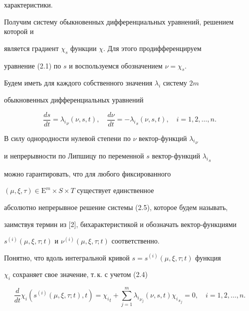 характеристики.





Получим систему обыкновенных дифференциальных уравнений, решением которой и 


является градиент $\chi_s$ функции $\chi$. Для этого продифференцируем 


уравнение (2.1) по $s$ и воспользуемся обозначением $\nu=\chi_s$.


Будем иметь для каждого собственного значения $\lambda_i$ систему $2m$


обыкновенных дифференциальных уравнений


\begin{equation}


\frac{ds}{dt}={\lambda_i}_\nu (\nu,s,t), \quad


\frac{d\nu}{dt}=- {\lambda_i}_s (\nu,s,t),\quad i=1,2,\dotsc,n.


\end{equation}





В силу однородности нулевой степени по $\nu$ вектор-функций ${\lambda_i}_\nu$ 


и непрерывности по Липшицу по переменной $s$ вектор-функций ${\lambda_i}_s$


можно гарантировать, что для любого фиксированного 


$(\mu,\xi,\tau) \in {\mathrm E}^m \times S \times T$ существует единственное 


абсолютно непрерывное решение системы (2.5), которое будем называть, 


заимствуя термин из [2], бихарактеристикой и обозначать вектор-функциями 


$s^{(i)}(\mu,\xi,\tau;t)$ и ${\nu}^{(i)}(\mu,\xi,\tau;t)$ соответственно.





Понятно, что вдоль интегральной кривой $s=s^{(i)}(\mu,\xi,\tau;t)$ функция


$\chi_i$ сохраняет свое значение, т.\,к. с учетом (2.4)


$$


\frac{d}{dt} \chi_i (s^{(i)}(\mu,\xi,\tau;t),t)={\chi_i}_t+


\sum_{j=1}^{m} {\lambda_i}_{\nu_j} (\nu,s,t) {\chi_i}_{s_j}=0,\quad


i=1,2,\dotsc,n. 


$$


